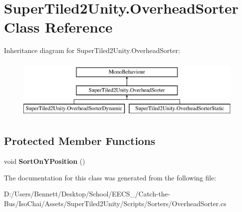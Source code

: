 \hypertarget{class_super_tiled2_unity_1_1_overhead_sorter}{}\section{Super\+Tiled2\+Unity.\+Overhead\+Sorter Class Reference}
\label{class_super_tiled2_unity_1_1_overhead_sorter}
Inheritance diagram for Super\+Tiled2\+Unity.\+Overhead\+Sorter\+:\begin{figure}[H]
\begin{center}
\leavevmode
\includegraphics[height=3.000000cm]{class_super_tiled2_unity_1_1_overhead_sorter}
\end{center}
\end{figure}
\subsection*{Protected Member Functions}
\begin{DoxyCompactItemize}
\item 
\mbox{\label{class_super_tiled2_unity_1_1_overhead_sorter_ab103a9fc69419b68d23e0294ffcae8fc}} 
void {\bfseries Sort\+On\+Y\+Position} ()
\end{DoxyCompactItemize}


The documentation for this class was generated from the following file\+:\begin{DoxyCompactItemize}
\item 
D\+:/\+Users/\+Bennett/\+Desktop/\+School/\+E\+E\+C\+S\+\_/\+Catch-\/the-\/\+Bus/\+Iso\+Chai/\+Assets/\+Super\+Tiled2\+Unity/\+Scripts/\+Sorters/Overhead\+Sorter.\+cs\end{DoxyCompactItemize}
